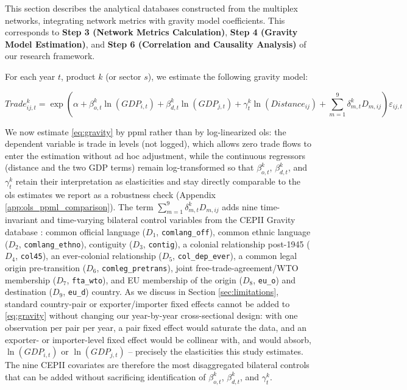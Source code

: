 \documentclass[preprint, 3p,
authoryear]{elsarticle} %
\begin{document}
\label{sec:gravity_spec}

This section describes the analytical databases constructed from the
multiplex networks, integrating network metrics with gravity model
coefficients. This corresponds to
\textbf{Step 3 (Network Metrics Calculation)},
\textbf{Step 4 (Gravity Model Estimation)}, and
\textbf{Step 6 (Correlation and Causality Analysis)} of our research
framework.

For each year \(t\), product \(k\) (or sector \(s\)), we estimate the
following gravity model:

\begin{equation}
Trade_{ij,t}^{k} = \exp\left(\alpha + \beta_{o,t}^{k} \ln(GDP_{i,t}) + \beta_{d,t}^{k} \ln(GDP_{j,t}) + \gamma_t^{k} \ln(Distance_{ij}) + \sum_{m=1}^{9} \delta_{m,t}^{k} D_{m,ij}\right) \varepsilon_{ij,t}
\label{eq:gravity}
\end{equation}

\noindent We now estimate \eqref{eq:gravity} by \gls{ppml}
\citep{SantosSilvaTenreyro2006} rather than by log-linearized \gls{ols}:
the dependent variable is trade in levels (not logged), which allows
zero trade flows to enter the estimation without ad hoc adjustment,
while the continuous regressors (distance and the two GDP terms) remain
log-transformed so that \(\beta_{o,t}^{k}\), \(\beta_{d,t}^{k}\), and
\(\gamma_t^{k}\) retain their interpretation as elasticities and stay
directly comparable to the \gls{ols} estimates we report as a robustness
check (Appendix \ref{app:ols_ppml_comparison}). The term
\(\sum_{m=1}^{9} \delta_{m,t}^{k} D_{m,ij}\) adds nine time-invariant
and time-varying bilateral control variables from the CEPII Gravity
database \citep{conte2022cepii}: common official language (\(D_1\),
\texttt{comlang\_off}), common ethnic language (\(D_2\),
\texttt{comlang\_ethno}), contiguity (\(D_3\), \texttt{contig}), a
colonial relationship post-1945 (\(D_4\), \texttt{col45}), an
ever-colonial relationship (\(D_5\), \texttt{col\_dep\_ever}), a common
legal origin pre-transition (\(D_6\), \texttt{comleg\_pretrans}), joint
free-trade-agreement/WTO membership (\(D_7\), \texttt{fta\_wto}), and EU
membership of the origin (\(D_8\), \texttt{eu\_o}) and destination
(\(D_9\), \texttt{eu\_d}) country. As we discuss in Section
\ref{sec:limitations}, standard country-pair or exporter/importer fixed
effects cannot be added to \eqref{eq:gravity} without changing our
year-by-year cross-sectional design: with one observation per pair per
year, a pair fixed effect would saturate the data, and an exporter- or
importer-level fixed effect would be collinear with, and would absorb,
\(\ln(GDP_{i,t})\) or \(\ln(GDP_{j,t})\) -- precisely the elasticities
this study estimates. The nine CEPII covariates are therefore the most
disaggregated bilateral controls that can be added without sacrificing
identification of \(\beta_{o,t}^{k}\), \(\beta_{d,t}^{k}\), and
\(\gamma_t^{k}\).
\end{document}
